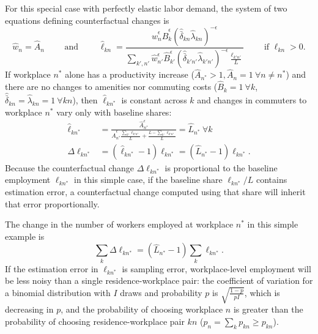 \documentclass[11pt]{article}
\theoremstyle{definition}
\begin{document}
For this special case with perfectly elastic labor demand,
the system of two equations defining counterfactual changes is
\begin{equation*}
\hat{w}_{n}
=
\hat{A}_n
\qquad \text{ and } \qquad
\hat{\ell}_{kn} 
=
\frac{\hat{w}_{n}^{\epsilon} \hat{B}_{k}^{\epsilon} \left(\hat{\bar{\delta}}_{kn}\hat{ \lambda}_{kn} \right)^{-\epsilon}}{\sum_{k',n'} \hat{w}_{n'}^{\epsilon} \hat{B}_{k'}^{\epsilon} \left( \hat{\bar{\delta}}_{k'n'}\hat{ \lambda}_{k'n'} \right)^{-\epsilon} \frac{\ell_{k'n'}}{L}} \qquad \text{ if } \ell_{kn} > 0
.\end{equation*}
If workplace $n^{*}$ alone has a productivity increase ($\hat{A}_{n^{*}} > 1, \hat{A}_{n} = 1 \ \forall n \neq n^{*}$)
and there are no changes to amenities nor commuting costs ($\hat{B}_{k} =1 \ \forall k $, $\hat{\bar{\delta}}_{kn} = \hat{\lambda}_{kn} =1 \ \forall kn $),
then $\hat{\ell}_{kn^{*}}$ is constant across $k$ and changes in commuters to workplace $n^{*}$ vary only with baseline shares:
\begin{align*}
\hat{\ell}_{kn^{*}} 
&=
\frac{\hat{A}_{n^{*}}^{\epsilon}}{\hat{A}_{n^{*}}^{\epsilon} \frac{\sum_{k'}\ell_{k'n^{*}}}{L} + \frac{L - \sum_{k'}\ell_{k'n^{*}}}{L}}
=
\hat{L}_{n^{*}}
\ \forall k
\\
\Delta {\ell}_{kn^{*}} 
&=
\left(\hat{\ell}_{kn^{*}}  - 1 \right){\ell}_{kn^{*}}
=
\left(\hat{L}_{n^{*}}  - 1 \right){\ell}_{kn^{*}}
.\end{align*}
Because the counterfactual change $\Delta {\ell}_{kn^{*}}$ is proportional to the baseline employment ${\ell}_{kn^{*}}$ in this simple case,
if the baseline share ${\ell}_{kn^{*}}/L$ contains estimation error,
a counterfactual change computed using that share will inherit that error proportionally.

The change in the number of workers employed at workplace $n^{*}$ in this simple example is
$$
\sum_{k} \Delta {\ell}_{kn^{*}} 
=
\left(\hat{L}_{n^{*}}  - 1 \right) \sum_{k} \ell_{kn^{*}}
.$$
If the estimation error in $\ell_{kn^{*}}$ is sampling error,
workplace-level employment will be less noisy than a single residence-workplace pair:
the coefficient of variation for a binomial distribution with $I$ draws and probability $p$ is $\sqrt{\frac{1-p}{p I}}$, which is decreasing in $p$,
and
the probability of choosing workplace $n$
is greater than the probability of choosing residence-workplace pair $kn$ ($p_n = \sum_{k} p_{kn} \geq p_{kn}$).
\end{document}
